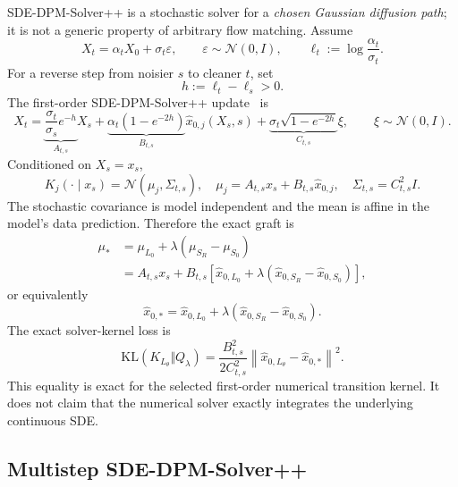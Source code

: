 \documentclass[11pt,a4paper]{article}
\newcommand{\N}{\mathcal{N}}
\newcommand{\KL}{\mathrm{KL}}
\newcommand{\norm}[1]{\left\lVert #1 \right\rVert}
\newcommand{\Sbase}{S_0}
\newcommand{\Srl}{S_R}
\newcommand{\Lbase}{L_0}
\newcommand{\Lactor}{L_\theta}
\theoremstyle{plain}
\theoremstyle{definition}
\begin{document}
SDE-DPM-Solver++ is a stochastic solver for a \emph{chosen Gaussian diffusion path}; it is not a
generic property of arbitrary flow matching.  Assume
\begin{equation}
X_t=\alpha_tX_0+\sigma_t\varepsilon,
\qquad
\varepsilon\sim\N(0,I),
\qquad
\ell_t:=\log\frac{\alpha_t}{\sigma_t}.
\label{eq:dpm-path}
\end{equation}
For a reverse step from noisier $s$ to cleaner $t$, set
\begin{equation}
h:=\ell_t-\ell_s>0.
\label{eq:dpm-h}
\end{equation}
The first-order SDE-DPM-Solver++ update~\cite{dpmsolverpp} is
\begin{equation}
X_t
=
\underbrace{\frac{\sigma_t}{\sigma_s}e^{-h}}_{A_{t,s}}X_s
+
\underbrace{\alpha_t(1-e^{-2h})}_{B_{t,s}}
\widehat x_{0,j}(X_s,s)
+
\underbrace{\sigma_t\sqrt{1-e^{-2h}}}_{C_{t,s}}\xi,
\qquad
\xi\sim\N(0,I).
\label{eq:dpm-first-order}
\end{equation}
Conditioned on $X_s=x_s$,
\begin{equation}
K_j(\cdot\mid x_s)
=
\N(\mu_j,\Sigma_{t,s}),
\quad
\mu_j=A_{t,s}x_s+B_{t,s}\widehat x_{0,j},
\quad
\Sigma_{t,s}=C_{t,s}^2I.
\label{eq:dpm-first-kernel}
\end{equation}
The stochastic covariance is model independent and the mean is affine in the model's data
prediction.  Therefore the exact graft is
\begin{align}
\mu_*
&=
\mu_{\Lbase}
+\lambda(\mu_{\Srl}-\mu_{\Sbase})
\nonumber\\
&=
A_{t,s}x_s
+B_{t,s}
\left[
\widehat x_{0,\Lbase}
+\lambda(
\widehat x_{0,\Srl}
-\widehat x_{0,\Sbase}
)
\right],
\label{eq:dpm-grafted-mean}
\end{align}
or equivalently
\begin{equation}
\boxed{
\widehat x_{0,*}
=
\widehat x_{0,\Lbase}
+\lambda(
\widehat x_{0,\Srl}
-\widehat x_{0,\Sbase}
).
}
\label{eq:dpm-x0-target}
\end{equation}
The exact solver-kernel loss is
\begin{equation}
\KL(K_{\Lactor}\Vert Q_\lambda)
=
\frac{B_{t,s}^2}{2C_{t,s}^2}
\norm{\widehat x_{0,\Lactor}-\widehat x_{0,*}}^2.
\label{eq:dpm-first-kl}
\end{equation}
This equality is exact for the selected first-order numerical transition kernel.  It does not
claim that the numerical solver exactly integrates the underlying continuous SDE.

\subsection{Multistep SDE-DPM-Solver++}
\end{document}
